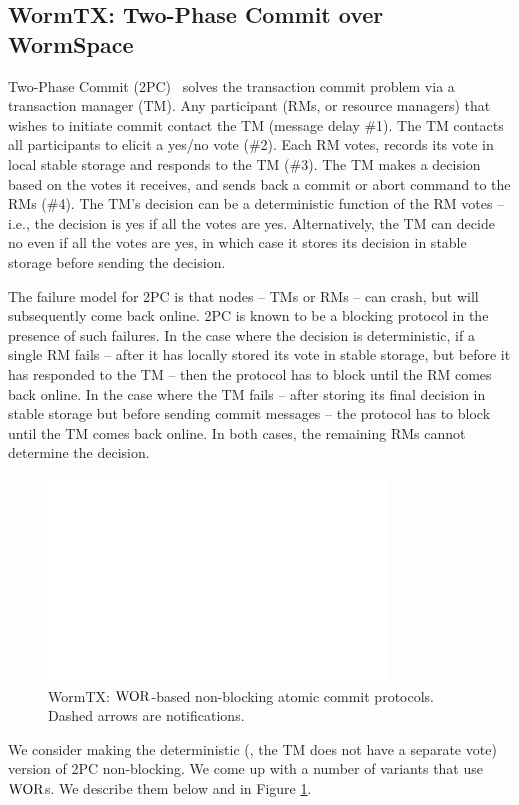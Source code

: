 \subsection{WormTX: Two-Phase Commit over WormSpace}
\label{chapter:wormspace:subsec:wormtx}

Two-Phase Commit (2PC)~\cite{distsys} solves the transaction commit problem via a transaction manager (TM). 
Any participant (RMs, or resource managers) that wishes to initiate commit contact the TM (message delay \#1). 
The TM contacts all participants to elicit a yes/no vote (\#2). Each RM votes, records its vote in local stable storage and responds to the TM (\#3). 
The TM makes a decision based on the votes it receives, and sends back a commit or abort command to the RMs (\#4). 
The TM's decision can be a deterministic function of the RM votes -- i.e., the decision is yes if all the votes are yes. 
Alternatively, the TM can decide no even if all the votes are yes, in which case it stores its decision in stable storage before sending the decision.

The failure model for 2PC is that nodes -- TMs or RMs -- can crash, but will subsequently come back online. 
2PC is known to be a blocking protocol in the presence of such failures. In the case where the decision is deterministic, 
if a single RM fails -- after it has locally stored its vote in stable storage, but before it has responded to the 
TM -- then the protocol has to block until the RM comes back online. In the case where the TM fails --
 after storing its final decision in stable storage but before sending commit messages -- 
 the protocol has to block until the TM comes back online. In both cases, the remaining RMs cannot determine the decision.    
 
\begin{figure}
\centering
\includegraphics[width=0.8\textwidth, page=5]{figs/multipaxos/pics-longer}
\caption{WormTX: $\mathrm{WOR}$-based non-blocking atomic commit protocols. Dashed arrows are notifications.}
\label{fig:chapter:multipaxos:commit}
\end{figure}
We consider making the deterministic (\ie, the TM does not have a separate vote) version of 2PC non-blocking. 
We come up with a number of variants that use $\mathrm{WOR}$s. We describe them below and in Figure \ref{fig:chapter:multipaxos:commit}.



